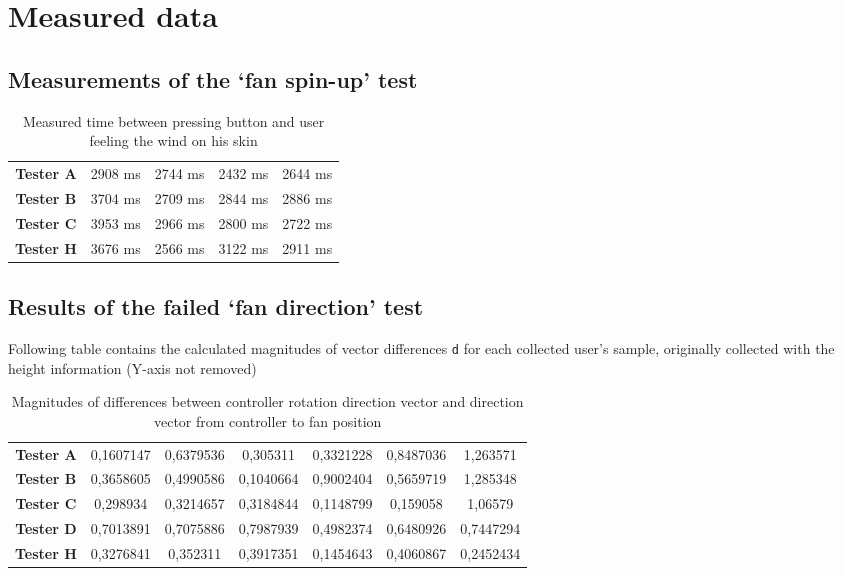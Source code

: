 \chapter{Measured data}

\label{appx:a}
\section{Measurements of the `fan spin-up' test}

\begin{table}
\centering
\begin{tabular}{|c|c|c|c|c|}
    \hline
    \textbf{Tester A} & 2908 ms & 2744 ms & 2432 ms & 2644 ms \\
    \textbf{Tester B} & 3704 ms & 2709 ms & 2844 ms & 2886 ms \\
    \textbf{Tester C} & 3953 ms & 2966 ms & 2800 ms & 2722 ms \\
    \textbf{Tester H} & 3676 ms & 2566 ms & 3122 ms & 2911 ms \\
    \hline
\end{tabular}
\caption{Measured time between pressing button and user feeling the wind on his skin}
\end{table}

\label{appx:b}
\section{Results of the failed `fan direction' test}
Following table contains the calculated magnitudes of vector differences \texttt{d}
for each collected user’s sample, originally collected with the
height information (Y-axis not removed)

\begin{table}
\centering
\begin{tabular}{|c|c|c|c|c|c|c|}
\hline
\textbf{Tester A} & 0,1607147 & 0,6379536 & 0,305311 & 0,3321228 & 0,8487036 & 1,263571 \\ 
\textbf{Tester B} & 0,3658605 & 0,4990586 & 0,1040664 & 0,9002404 & 0,5659719 & 1,285348 \\ 
\textbf{Tester C} & 0,298934 & 0,3214657 & 0,3184844 & 0,1148799 & 0,159058 & 1,06579 \\ 
\textbf{Tester D} & 0,7013891 & 0,7075886 & 0,7987939 & 0,4982374 & 0,6480926 & 0,7447294 \\ 
\textbf{Tester H} & 0,3276841 & 0,352311 & 0,3917351 & 0,1454643 & 0,4060867 & 0,2452434 \\ 
\hline
\end{tabular}
\caption{Magnitudes of differences between controller rotation direction vector and direction vector from controller to fan position}
\end{table}

